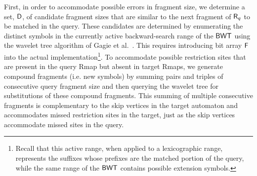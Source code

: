 First, in order to accommodate possible errors in fragment size, we determine a set, $\mbox{\rm {\sf D}}$, of candidate fragment sizes that are similar to the next fragment of $\mbox{\rm {\sf R}}_q$ to be matched in the query. These candidates are determined by enumerating the distinct symbols in the currently active backward-search range of the $\mbox{\rm {\sf BWT}}$ using the wavelet tree algorithm of Gagie et al.~\cite{GNPtcs11}.  This requires introducing bit array $\mbox{\rm {\sf F}}$ into the actual implementation\footnote{Recall that this active range, when applied to a lexicographic range, represents the suffixes whose prefixes are the matched portion of the query, while the same range of the $\mbox{\rm {\sf BWT}}$ contains possible extension symbols.}. To accommodate possible restriction sites that are present in the query Rmap but absent in target Rmaps, we generate compound fragments (i.e. new symbols) by summing pairs and triples of consecutive query fragment size and then querying the wavelet tree for substitutions of these compound fragments. This summing of multiple consecutive fragments is complementary to the skip vertices in the target automaton and accommodates missed restriction sites in the target, just as the skip vertices accommodate missed sites in the query.  %




